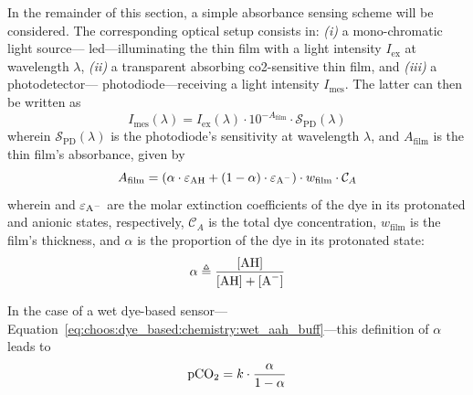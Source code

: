 In the remainder of this section, a simple absorbance sensing scheme will be considered. The corresponding optical setup consists in: \textit{(i)} a mono-chromatic light source---\eg{} \gls{led}---illuminating the thin film with a light intensity $I_\text{ex}$ at wavelength $\lambda$, \textit{(ii)} a transparent absorbing \gls{co2}-sensitive thin film, and \textit{(iii)} a photodetector---\eg{} photodiode---receiving a light intensity $I_\text{mes}$. The latter can then be written as
\begin{equation}\label{eq:choos:dye_based:chemistry:bl_simple_abs}
	I_\text{mes}(\lambda) = I_\text{ex}(\lambda) \cdot 10^{-A_\text{film}} \cdot \mathcal{S}_\text{PD}(\lambda)
\end{equation}
wherein $\mathcal{S}_\text{PD}(\lambda)$ is the photodiode's sensitivity at wavelength $\lambda$, and $A_\text{film}$ is the thin film's absorbance, given by
\begin{equation}
	A_\text{film} = \left( \alpha \cdot \ce{ \varepsilon_{AH}} + (1-\alpha) \cdot \ce{\varepsilon_{A^-}} \right) \cdot w_\text{film} \cdot \mathcal{C}_A
\end{equation}
wherein  and $\ce{\varepsilon_{A^-}}$ are the molar extinction coefficients of the dye in its protonated and anionic states, respectively, $\mathcal{C}_A$ is the total dye concentration, $w_\text{film}$ is the film's thickness, and $\alpha$ is the proportion of the dye in its protonated state:
\begin{equation}
	\alpha \triangleq \ce{\frac{[AH]}{[AH] + [A^-]}}
\end{equation}

In the case of a wet dye-based sensor---Equation~\ref{eq:choos:dye_based:chemistry:wet_aah_buff}---this definition of $\alpha$ leads to
\begin{equation}\label{eq:choos:dye_based:chemistry:pco2_alpha}
	\ce{pCO_2} = k \cdot \frac{\alpha}{1 - \alpha}
\end{equation}

